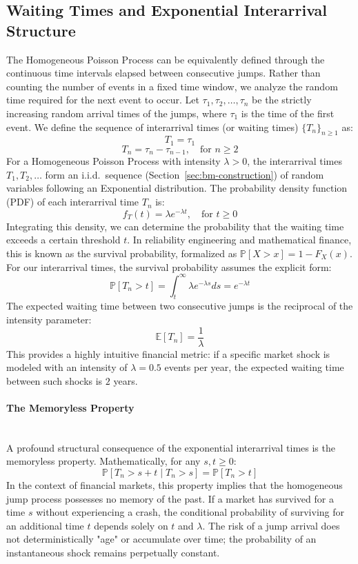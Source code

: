 \subsection{Waiting Times and Exponential Interarrival Structure}
The Homogeneous Poisson Process can be equivalently defined through the continuous time intervals elapsed between consecutive jumps. Rather than counting the number of events in a fixed time window, we analyze the random time required for the next event to occur. Let $\tau_1, \tau_2, \dots, \tau_n$ be the strictly increasing random arrival times of the jumps, where $\tau_1$ is the time of the first event. We define the sequence of interarrival times (or waiting times) $\{T_n\}_{n \ge 1}$ as:
$$T_1 = \tau_1$$
$$T_n = \tau_n - \tau_{n-1}, \quad \text{for } n \ge 2$$
For a Homogeneous Poisson Process with intensity $\lambda > 0$, the interarrival times $T_1, T_2, \dots$ form an i.i.d.\ sequence (Section~\ref{sec:bm-construction}) of random variables following an Exponential distribution. The probability density function (PDF) of each interarrival time $T_n$ is:
$$f_T(t) = \lambda e^{-\lambda t}, \quad \text{for } t \ge 0$$
Integrating this density, we can determine the probability that the waiting time exceeds a certain threshold $t$. In reliability engineering and mathematical finance, this is known as the survival probability, formalized as $\mathbb{P}[X > x] = 1 - F_X(x)$. For our interarrival times, the survival probability assumes the explicit form:
$$\mathbb{P}[T_n > t] = \int_t^\infty \lambda e^{-\lambda s} ds = e^{-\lambda t}$$
The expected waiting time between two consecutive jumps is the reciprocal of the intensity parameter:
$$\mathbb{E}[T_n] = \frac{1}{\lambda}$$
This provides a highly intuitive financial metric: if a specific market shock is modeled with an intensity of $\lambda = 0.5$ events per year, the expected waiting time between such shocks is $2$ years.
\paragraph{The Memoryless Property}~\\
A profound structural consequence of the exponential interarrival times is the memoryless property. Mathematically, for any $s, t \ge 0$:
$$\mathbb{P}[T_n > s + t \mid T_n > s] = \mathbb{P}[T_n > t]$$
In the context of financial markets, this property implies that the homogeneous jump process possesses no memory of the past. If a market has survived for a time $s$ without experiencing a crash, the conditional probability of surviving for an additional time $t$ depends solely on $t$ and $\lambda$. The risk of a jump arrival does not deterministically "age" or accumulate over time; the probability of an instantaneous shock remains perpetually constant.
